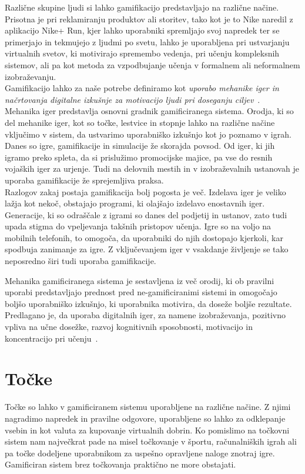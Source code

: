 \documentclass[a4paper, 12pt]{book}
\begin{document}
Različne skupine ljudi si lahko gamifikacijo predstavljajo na različne načine. Prisotna je pri reklamiranju produktov ali storitev, tako kot je to Nike naredil z aplikacijo Nike+ Run, kjer lahko uporabniki spremljajo svoj napredek ter se primerjajo in tekmujejo z ljudmi po svetu, lahko je uporabljena pri ustvarjanju virtualnih svetov, ki motivirajo spremembo vedenja, pri učenju kompleksnih sistemov, ali pa kot metoda za vzpodbujanje učenja v formalnem ali neformalnem izobraževanju.\\
Gamifikacijo lahko za naše potrebe definiramo kot \textit{uporabo mehanike iger in načrtovanja digitalne izkušnje za motivacijo ljudi pri doseganju ciljev}~\cite{gargame1}.\\Mehanika iger predstavlja osnovni gradnik gamificiranega sistema. Orodja, ki so del mehanike iger, kot so točke, lestvice in stopnje lahko na različne načine vključimo v sistem, da ustvarimo uporabniško izkušnjo kot jo poznamo v igrah.\\
Danes so igre, gamifikacije in simulacije že skorajda povsod. Od iger, ki jih igramo preko spleta, da si prislužimo promocijske majice, pa vse do resnih vojaških iger za urjenje. Tudi na delovnih mestih in v izobraževalnih ustanovah je uporaba gamifikacije že sprejemljiva praksa.\\Razlogov zakaj postaja gamifikacija bolj pogosta je več. Izdelava iger je veliko lažja kot nekoč, obstajajo programi, ki olajšajo izdelavo enostavnih iger. Generacije, ki so odraščale z igrami so danes del podjetij in ustanov, zato tudi upada stigma do vpeljevanja takšnih pristopov učenja. Igre so na voljo na mobilnih telefonih, to omogoča, da uporabniki do njih dostopajo kjerkoli, kar spodbuja zanimanje za igre. Z vključevanjem iger v vsakdanje življenje se tako neposredno širi tudi uporaba gamifikacije. 

Mehanika gamificiranega sistema je sestavljena iz več orodij, ki ob pravilni uporabi predstavljajo prednost pred ne-gamificiranimi sistemi  in omogočajo boljšo uporabniško izkušnjo, ki uporabnika motivira, da doseže boljše rezultate. Predlagano je, da uporaba digitalnih iger, za namene izobraževanja, pozitivno vpliva na učne dosežke, razvoj kognitivnih sposobnosti, motivacijo in koncentracijo pri učenju~\cite{nint}.

\section{Točke}
Točke so lahko v gamificiranem sistemu uporabljene na različne načine. Z njimi nagradimo napredek in pravilne odgovore, uporabljene so lahko za odklepanje vsebin in kot valuta za kupovanje virtualnih dobrin.
Ko pomislimo na točkovni sistem nam največkrat pade na misel točkovanje v športu, računalniških igrah ali pa točke dodeljene uporabnikom za uspešno opravljene naloge znotraj igre.
Gamificiran sistem brez točkovanja praktično ne more obstajati.
\end{document}

